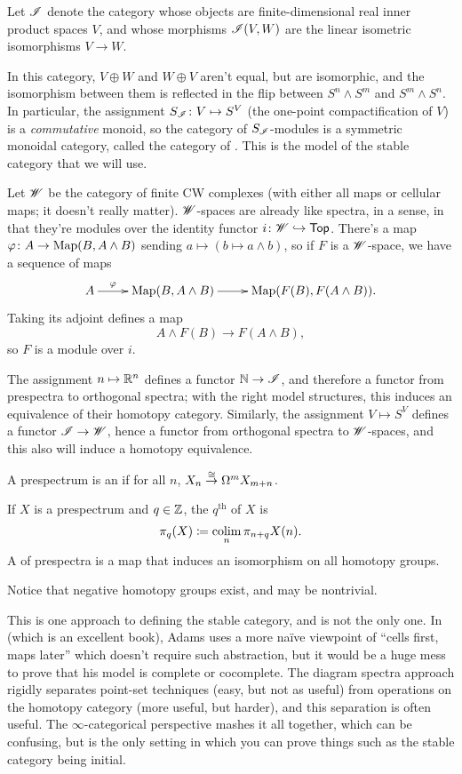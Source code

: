 \begin{exm}
\label{orthogonal_spectra}
Let $\mathscr I$ denote the category whose objects are finite-dimensional real inner product spaces $V$, and whose
morphisms $\mathscr I(V,W)$ are the linear isometric isomorphisms $V\to W$.

In this category, $V\oplus W$ and $W\oplus V$ aren't equal, but are isomorphic, and the isomorphism between them is
reflected in the flip between $S^n\wedge S^m$ and $S^m\wedge S^n$. In particular, the assignment $S_\sI\colon
V\mapsto S^V$ (the one-point compactification of $V$) is a \emph{commutative} monoid, so the category of
$S_\mathscr I$-modules is a symmetric monoidal category, called the category of . This is the
model of the stable category that we will use.
\end{exm}
\begin{exm}[$\sW$-spaces]
\label{wspaces}
Let $\sW$ be the category of finite CW complexes (with either all maps or cellular maps; it doesn't really matter).
$\sW$-spaces are already like spectra, in a sense, in that they're modules over the identity functor
$i\colon\mathscr W\hookrightarrow\mathsf{Top}$. There's a map $\varphi\colon A\to\operatorname{Map}(B, A\wedge B)$ sending $a\mapsto (b\mapsto a\wedge b)$, so
if $F$ is a
$\sW$-space, we have a sequence of maps
\[\xymatrix{
	A\ar[r]^-\vp & \Map(B, A\wedge B)\ar[r] &\Map(F(B), F(A\wedge B)).
}\]
Taking its adjoint defines a map
\[A\wedge F(B)\longrightarrow F(A\wedge B),\]
so $F$ is a module over $i$.
\end{exm}
The assignment $n\mapsto\R^n$ defines a functor $\mathbb N\to\mathscr I$, and therefore a functor from prespectra to orthogonal
spectra; with the right model structures, this induces an equivalence of their homotopy category. Similarly, the
assignment $V\mapsto S^V$ defines a functor $\mathscr I\to\mathscr W$, hence a functor from orthogonal spectra to $\sW$-spaces,
and this also will induce a homotopy equivalence.
\begin{defn}
A prespectrum is an  if for all $n$, $X_n\stackrel\cong\to\Omega^mX_{m+n}$.
\end{defn}
\begin{defn}
If $X$ is a prespectrum and $q\in\mathbb Z$, the $q^{\text{th}}$  of $X$ is
\[\pi_q(X)\coloneqq \operatorname*{colim}_n \pi_{n+q}X(n).\]
A  of prespectra is a map that induces an isomorphism on all homotopy groups.
\end{defn}
Notice that negative homotopy groups exist, and may be nontrivial.
\begin{rem}
This is one approach to defining the stable category, and is not the only one. In~\cite{AdamsStableHomotopy} (which
is an excellent book), Adams uses a more naïve viewpoint of ``cells first, maps later'' which doesn't require such
abstraction, but it would be a huge mess to prove that his model is complete or cocomplete. The diagram spectra
approach rigidly separates point-set techniques (easy, but not as useful) from operations on the homotopy category
(more useful, but harder), and this separation is often useful. The $\infty$-categorical perspective mashes it all
together, which can be confusing, but is the only setting in which you can prove things such as the stable
category being initial.
\end{rem}
